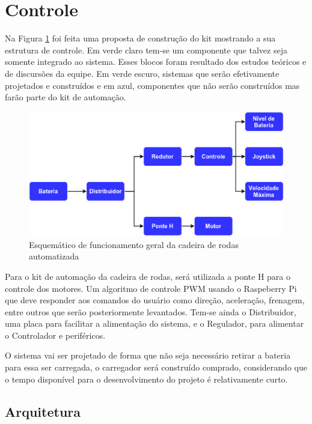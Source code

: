 \section{Controle}

 Na Figura \ref{fig:esquema_controle} foi feita uma proposta de construção do kit mostrando a sua estrutura de controle. Em verde claro tem-se um componente que talvez seja somente integrado ao sistema. Esses blocos foram resultado dos estudos teóricos e de discursões da equipe. Em verde escuro, sistemas que serão efetivamente projetados e construídos e em azul, componentes que não serão construídos mas farão parte do kit de automação.

\begin{figure}[!htb]
\centering
  \includegraphics[keepaspectratio=true,scale=0.6]{figuras/resultados/esquema_controle}
\caption{Esquemático de funcionamento geral da cadeira de rodas automatizada}
\label{fig:esquema_controle}
\end{figure}

Para o kit de automação da cadeira de rodas, será utilizada a ponte H para o controle dos motores. Um algoritmo de controle PWM usando o Raspeberry Pi que deve responder aos comandos do usuário como direção, aceleração, frenagem, entre outros que serão posteriormente levantados. Tem-se ainda o Distribuidor, uma placa para facilitar a alimentação do sistema, e o Regulador, para alimentar o Controlador e periféricos.

O sistema vai ser projetado de forma que não seja necessário retirar a bateria para essa ser carregada, o carregador será construído comprado, considerando que o tempo disponível para o desenvolvimento do projeto é relativamente curto.

\subsection{Arquitetura}

